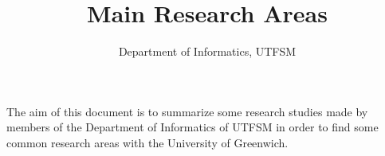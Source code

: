 \documentclass[12pt,reqno]{amsart}
\title{Main Research Areas}
\author{Department of Informatics, UTFSM}
\begin{document}
\maketitle

The aim of this document is to summarize some research studies made by members
of the Department of Informatics of UTFSM in order to find some common research
areas with the University of Greenwich.











%

\end{document}
